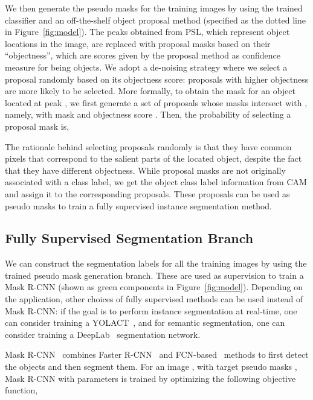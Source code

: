\documentclass{bmvc2k}
\begin{document}
We then generate the pseudo masks for the training images by using the trained classifier and an off-the-shelf object proposal method (specified as the dotted line in Figure~\ref{fig:model}). The peaks obtained from PSL, which represent object locations in the image, are replaced with proposal masks based on their ``objectness'', which are scores given by the proposal method as confidence measure for being objects. We adopt a de-noising strategy where we select a proposal randomly based on its objectness score: proposals with higher objectness are more likely to be selected. More formally, to obtain the mask for an object located at peak , we first generate a set of  proposals whose masks intersect with , namely,  with mask  and objectness score . Then, the probability of selecting a proposal mask  is,



The rationale behind selecting proposals randomly is that they have common pixels that correspond to the salient parts of the located object, despite the fact that they have different objectness. While proposal masks are not originally associated with a class label, we get the object class label information from CAM and assign it to the corresponding proposals. These proposals can be used as pseudo masks to train a fully supervised instance segmentation method.





\subsection{Fully Supervised Segmentation Branch}
We can construct the segmentation labels for all the training images by using the trained pseudo mask generation branch. These are used as supervision to train a Mask R-CNN (shown as green components in Figure~\ref{fig:model}). Depending on the application, other choices of fully supervised methods can be used instead of Mask R-CNN: if the goal is to perform instance segmentation at real-time, one can consider training a YOLACT~\cite{bolya2019yolact}, and for semantic segmentation, one can consider training a DeepLab~\cite{chen2018deeplab} segmentation network.

Mask R-CNN~\cite{he2017mask} combines Faster R-CNN~\cite{ren2015faster} and FCN-based~\cite{long2015fully} methods to first detect the objects and then segment them. For an image , with target pseudo masks , Mask R-CNN with parameters  is trained by optimizing the following objective function,
\end{document}
